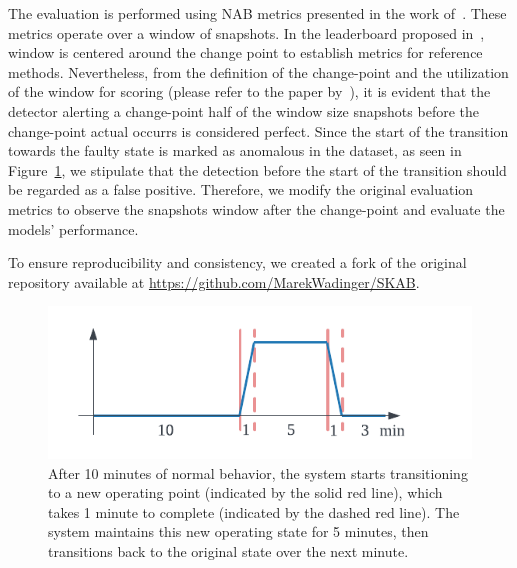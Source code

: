 The evaluation is performed using NAB metrics presented in the work of~\citet{Ahmad2017}. These metrics operate over a window of snapshots. In the leaderboard proposed in~\citet{Katser2020}, window is centered around the change point to establish metrics for reference methods. Nevertheless, from the definition of the change-point and the utilization of the window for scoring (please refer to the paper by~\citet{Lavin2015}), it is evident that the detector alerting a change-point half of the window size snapshots before the change-point actual occurrs is considered perfect. Since the start of the transition towards the faulty state is marked as anomalous in the dataset, as seen in Figure~\ref{fig:scab_interpretation}, we stipulate that the detection before the start of the transition should be regarded as a false positive. Therefore, we modify the original evaluation metrics to observe the snapshots window after the change-point and evaluate the models' performance.

To ensure reproducibility and consistency, we created a fork of the original repository available at \url{https://github.com/MarekWadinger/SKAB}.

\begin{figure}[H]
    \centering
    \includegraphics[width=\linewidth]{figures/scab-interpretation.pdf}
    \caption{After 10 minutes of normal behavior, the system starts transitioning to a new operating point (indicated by the solid red line), which takes 1 minute to complete (indicated by the dashed red line). The system maintains this new operating state for 5 minutes, then transitions back to the original state over the next minute.}\label{fig:scab_interpretation}
\end{figure}

